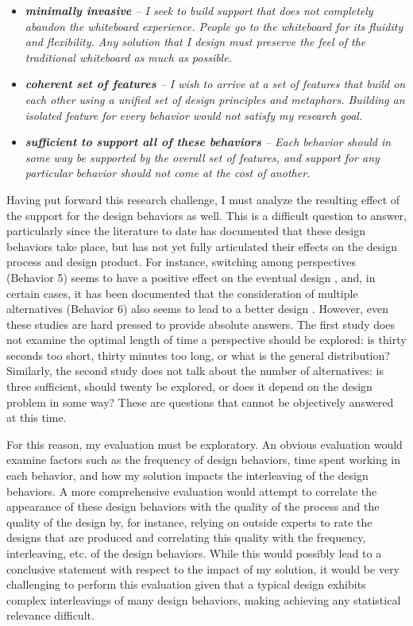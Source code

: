 \documentclass[12pt,fleqn]{ucithesis}
\begin{document}
\begin{itemize}

\item \emph{\textbf{minimally invasive} -- I seek to build support that does not completely abandon the whiteboard experience. People go to the whiteboard for its fluidity and flexibility. Any solution that I design must preserve the feel of the traditional whiteboard as much as possible.}

\item \emph{\textbf{coherent set of features} -- I wish to arrive at a set of features that build on each other using a unified set of design principles and metaphors. Building an isolated feature for every behavior would not satisfy my research goal.}

\item \emph{\textbf{sufficient to support all of these behaviors} -- Each behavior should in some way be supported by the overall set of features, and support for any particular behavior should not come at the cost of another. }
\end{itemize}

Having put forward this research challenge, I must analyze the resulting effect of the support for the design behaviors as well. This is a difficult question to answer, particularly since the literature to date has documented that these design behaviors take place, but has not yet fully articulated their effects on the design process and design product. For instance, switching among perspectives (Behavior 5) seems to have a positive effect on the eventual design \cite{baker2010ideas}, and, in certain cases, it has been documented that the consideration of multiple alternatives (Behavior 6) also seems to lead to a better design \cite{buxton2010sketching}. However, even these studies are hard pressed to provide absolute answers. The first study does not examine the optimal length of time a perspective should be explored: is thirty seconds too short, thirty minutes too long, or what is the general distribution? Similarly, the second study does not talk about the number of alternatives: is three sufficient, should twenty be explored, or does it depend on the design problem in some way? These are questions that cannot be objectively answered at this time. 

For this reason, my evaluation must be exploratory. An obvious evaluation would examine factors such as the frequency of design behaviors, time spent working in each behavior, and how my solution impacts the interleaving of the design behaviors. A more comprehensive evaluation would attempt to correlate the appearance of these design behaviors with the quality of the process and the quality of the design by, for instance, relying on outside experts to rate the designs that are produced and correlating this quality with the frequency, interleaving, etc. of the design behaviors. While this would possibly lead to a conclusive statement with respect to the impact of my solution, it would be very challenging to perform this evaluation given that a typical design exhibits complex interleavings of many design behaviors, making achieving any statistical relevance difficult. 
\end{document}
